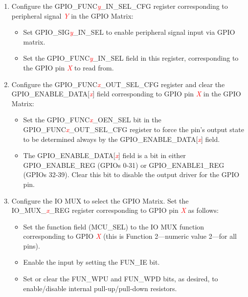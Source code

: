 \documentclass[main\_\_EN.tex]{subfiles}
\begin{document}
\begin{enumerate}
    \item Configure the GPIO\_FUNC\textcolor{red}{\it{y}}\_IN\_SEL\_CFG register corresponding to peripheral signal \textcolor{red}{\it{Y}} in the GPIO Matrix:
    \begin{itemize}
        \item Set GPIO\_SIG\textcolor{red}{\it{y}}\_IN\_SEL to enable peripheral signal input via GPIO matrix.
        \item Set the GPIO\_FUNC\textcolor{red}{\it{y}}\_IN\_SEL field in this register, corresponding to the GPIO pin \textcolor{red}{\it{X}} to read from.
    \end{itemize}
    \item Configure the GPIO\_FUNC\textcolor{red}{\it{x}}\_OUT\_SEL\_CFG register and clear the GPIO\_ENABLE\_DATA[\textcolor{red}{\it{x}}] field corresponding to GPIO pin \textcolor{red}{\it{X}} in the GPIO Matrix:
    \begin{itemize}
        \item Set the GPIO\_FUNC\textcolor{red}{\it{x}}\_OEN\_SEL bit in the GPIO\_FUNC\textcolor{red}{\it{x}}\_OUT\_SEL\_CFG register to force the pin's output state to be determined always by the GPIO\_ENABLE\_DATA[\textcolor{red}{\it{x}}] field.
        \item The GPIO\_ENABLE\_DATA[\textcolor{red}{\it{x}}] field is a bit in either GPIO\_ENABLE\_REG (GPIOs 0-31) or GPIO\_ENABLE1\_REG (GPIOs 32-39). Clear this bit to disable the output driver for the GPIO pin.
    \end{itemize}
    \item Configure the IO MUX to select the GPIO Matrix. Set the IO\_MUX\_\textcolor{red}{\it{x}}\_REG register corresponding to GPIO pin \textcolor{red}{\it{X}} as follows:
    \begin{itemize}
        \item Set the function field (MCU\_SEL) to the IO MUX function corresponding to GPIO \textcolor{red}{\it{X}} (this is Function 2---numeric value 2---for all pins).
        \item Enable the input by setting the FUN\_IE bit.
        \item Set or clear the FUN\_WPU and FUN\_WPD bits, as desired, to enable/disable internal pull-up/pull-down resistors.
    \end{itemize}
\end{enumerate}
\end{document}
